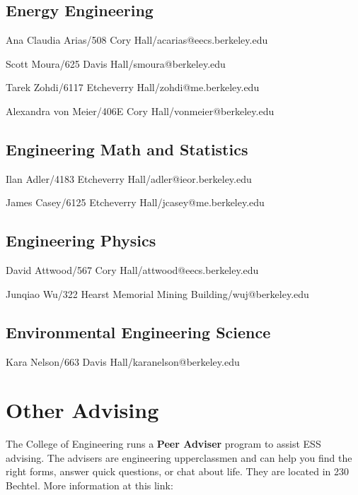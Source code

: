 \subsection*{Energy Engineering}

Ana Claudia Arias/508 Cory Hall/{\selectfont acarias@eecs.berkeley.edu}

Scott Moura/625 Davis Hall/{\selectfont smoura@berkeley.edu}

Tarek Zohdi/6117 Etcheverry Hall/{\selectfont zohdi@me.berkeley.edu}

Alexandra von Meier/406E Cory Hall/{\selectfont vonmeier@berkeley.edu }

\subsection*{Engineering Math and Statistics}

Ilan Adler/4183 Etcheverry Hall/{\selectfont adler@ieor.berkeley.edu}

James Casey/6125 Etcheverry Hall/{\selectfont jcasey@me.berkeley.edu}

\subsection*{Engineering Physics}

David Attwood/567 Cory Hall/{\selectfont attwood@eecs.berkeley.edu}

Junqiao Wu/322 Hearst Memorial Mining Building/{\selectfont wuj@berkeley.edu}

\begin{comment}
Alex Zettl/341 Birge Hall/{\fontfamily{qcr}\selectfont azettl@physics.berkeley.edu} %
\end{comment}
\subsection*{Environmental Engineering Science}

Kara Nelson/663 Davis Hall/{\selectfont karanelson@berkeley.edu}

\section*{Other Advising}

The College of Engineering runs a \textbf{Peer Adviser} program to assist ESS advising. The advisers are engineering upperclassmen and can help you find the right forms, answer quick questions, or chat about life. They are located in 230 Bechtel. More information at this link:

